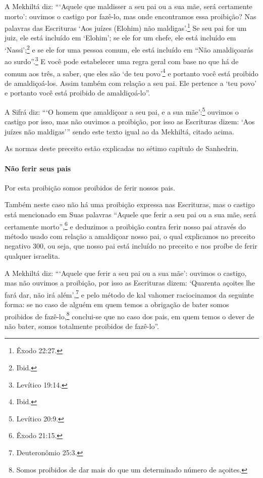 A Mekhiltá diz: ```Aquele que maldisser a seu pai ou a sua mãe, será
certamente morto': ouvimos o castigo por fazê-lo, mas onde encontramos
essa proibição? Nas palavras das Escrituras `Aos juízes (Elohim) não
maldigas'.\footnote{Êxodo 22:27.} Se seu pai for um juiz, ele está incluído em
`Elohim'; se ele for um chefe, ele está incluído em
`Nassi';\footnote{Ibid.} e se ele for uma pessoa comum, ele está incluído em
``Não amaldiçoarás ao surdo''.\footnote{Levítico 19:14.} E você pode estabelecer
uma regra geral com base no que há de comum aos três, a saber, que eles
são `de teu povo'\footnote{Ibid.} e portanto você está proibido de
amaldiçoá-los. Assim também com relação a seu pai. Ele pertence a `teu
povo' e portanto você está proibido de amaldiçoá-lo''.

A Sifrá diz: ```O homem que amaldiçoar a seu pai, e a sua mãe':\footnote{Levítico
20:9.} ouvimos o castigo por isso, mas não ouvimos a proibição, por isso
as Escrituras dizem: `Aos juízes não maldigas''' sendo este texto igual
ao da Mekhiltá, citado acima.

As normas deste preceito estão explicadas no sétimo capítulo de Sanhedrin.

\paragraph{Não ferir seus pais}

Por esta proibição somos proibidos de ferir nossos pais.

Também neste caso não há uma proibição expressa nas Escrituras, mas o
castigo está mencionado em Suas palavras ``Aquele que ferir a seu pai ou
a sua mãe, será certamente morto'',\footnote{Êxodo 21:15.} e deduzimos a
proibição contra ferir nosso pai através do método usado com relação a
amaldiçoar nosso pai, o qual explicamos no preceito negativo 300, ou
seja, que nosso pai está incluído no preceito e nos proíbe de ferir
qualquer israelita.

A Mekhiltá diz: ```Aquele que ferir a seu pai ou a sua mãe': ouvimos o
castigo, mas não ouvimos a proibição, por isso as Escrituras dizem:
`Quarenta açoites lhe fará dar, não irá além',\footnote{Deuteronômio 25:3.} e
pelo método de kal vahomer\starr{} raciocinamos da
seguinte forma: se no caso de alguém em quem temos a obrigação de bater
somos proibidos de fazê-lo,\footnote{Somos proibidos de dar mais do que um determinado número de açoites.} conclui-se que no caso
dos pais, em quem temos o dever de não bater, somos totalmente
proibidos de fazê-lo''.

